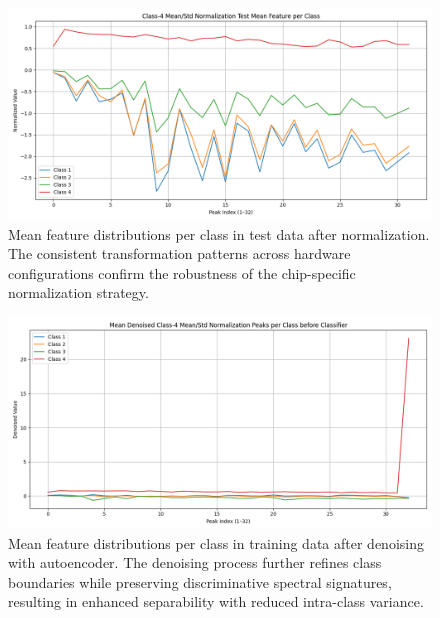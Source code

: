 \begin{figure}[H]
\centering
\includegraphics[width=\textwidth]{out/class_based_mean_std_normalized/class_based_mean_std_normalized_test_mean_feature_per_class.png}
\caption{Mean feature distributions per class in test data after normalization. The consistent transformation patterns across hardware configurations confirm the robustness of the chip-specific normalization strategy.}
\label{fig:normalized_test_features}
\end{figure}

\begin{figure}[H]
\centering
\includegraphics[width=\textwidth]{out/class_based_mean_std_normalized/denoised_class_based_mean_std_normalized_train_mean_feature_per_class.png}
\caption{Mean feature distributions per class in training data after denoising with autoencoder. The denoising process further refines class boundaries while preserving discriminative spectral signatures, resulting in enhanced separability with reduced intra-class variance.}
\label{fig:denoised_train_features}
\end{figure}

